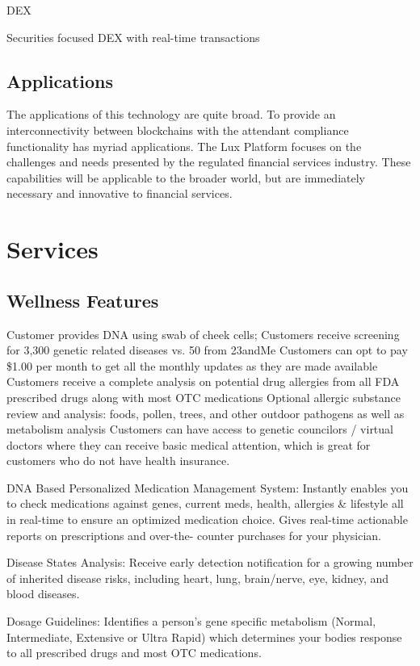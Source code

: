 \documentclass[11pt]{article}
\begin{document}
DEX


Securities focused DEX with real-time transactions


\subsection{Applications}

The applications of this technology are quite broad. To provide an interconnectivity between blockchains with the attendant compliance functionality has myriad applications. The Lux Platform focuses on the challenges and needs presented by the regulated financial services industry. These capabilities will be applicable to the broader world, but are immediately necessary and innovative to financial services.


\section{Services}

\subsection{Wellness Features}

Customer provides DNA using swab of cheek cells; Customers receive screening for 3,300 genetic related diseases vs. 50 from 23andMe Customers can opt to pay \$1.00 per month to get all the monthly updates as they are made available Customers receive a complete analysis on potential drug allergies from all FDA prescribed drugs along with most OTC medications Optional allergic substance review and analysis: foods, pollen, trees, and other outdoor pathogens as well as metabolism analysis Customers can have access to genetic councilors / virtual doctors where they can receive basic medical attention, which is great for customers who do not have health insurance.


DNA Based Personalized Medication Management System: Instantly enables you to check medications against genes, current meds, health, allergies \& lifestyle all in real-time to ensure an optimized medication choice. Gives real-time actionable reports on prescriptions and over-the- counter purchases for your physician.


Disease States Analysis: Receive early detection notification for a growing number of inherited disease risks, including heart, lung, brain/nerve, eye, kidney, and blood diseases.


Dosage Guidelines: Identifies a person's gene specific metabolism (Normal, Intermediate, Extensive or Ultra Rapid) which determines your bodies response to all prescribed drugs and most OTC medications.
\end{document}
